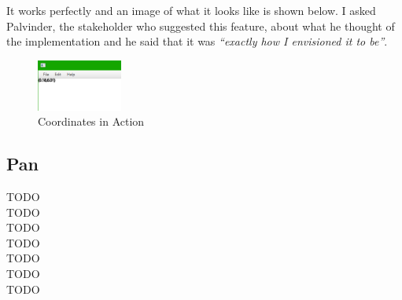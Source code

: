 \documentclass[../../../../main.tex]{subfiles}
\begin{document}
It works perfectly and an image of what it looks like is shown below. I asked Palvinder, the stakeholder who suggested this feature, about what he thought of the implementation and he said that it was \textit{``exactly how I envisioned it to be''}.
\begin{figure}[H]
	\centering
	\includegraphics[width=0.25\textwidth]{images/coords}
	\caption{Coordinates in Action}
\end{figure}



\newpage
\subsection{Pan}
{\Large TODO}\\
{\Large TODO}\\
{\Large TODO}\\
{\Large TODO}\\
{\Large TODO}\\
{\Large TODO}\\
{\Large TODO}

\newpage
\end{document}
